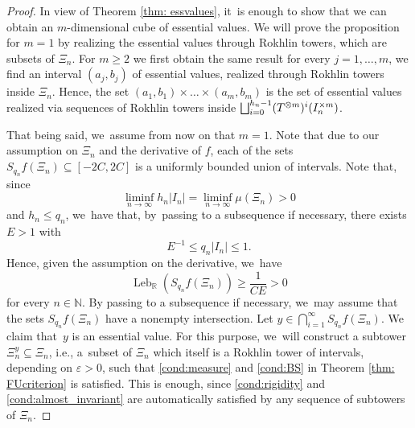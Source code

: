 \documentclass[JEP,XML,SOM,Unicode,NoEqCountersInSection,NoFloatCountersInSection,published]{cedram}
\let\oldbigsqcup\bigsqcup
\renewcommand{\bigsqcup}{\mathop{\textstyle\oldbigsqcup}\displaylimits}
\let\epsilon\varepsilon
\DeclareMathOperator{\Leb}{Leb}
\theoremstyle{plain}
\theoremstyle{definition}
\newcommand{\N}{\mathbb{N}}
\newcommand{\R}{\mathbb{R}}
\begin{document}
\begin{proof}
In view of Theorem \ref{thm: essvalues}, it~is enough to show that we can
obtain an $m$\nobreakdash-dimensional cube of essential values. We will prove the
proposition for $m=1$ by realizing the essential values through Rokhlin
towers, which are subsets of $\Xi_n$. For $m\ge 2$ we first obtain the
same result for every $j=1,\ldots,m$, \ie we find an interval $(a_j,b_j)$
of essential values, realized through Rokhlin towers inside $\Xi_n$. Hence,
the set $(a_1,b_1)\times\ldots\times(a_m,b_m)$ is the set of essential
values realized via sequences of Rokhlin towers inside
$\bigsqcup_{i=0}^{h_n-1}(T^{\otimes m})^i(I_n^{\times m})$.

That being said, we~assume from now on that $m=1$. Note that due to our assumption on $\Xi_n$ and the derivative of $f$, each of the sets $S_{q_n}f(\Xi_n)\subseteq [-2C,2C]$ is a uniformly bounded union of intervals. Note that, since
\[
\liminf_{n\to\infty} h_n |I_n| = \liminf_{n\to\infty}\mu(\Xi_n) > 0
\]
and $h_n\le q_n$, we~have that, by~passing to a subsequence if necessary, there exists $E>1$ with
\[
E^{-1}\le q_n|I_n|\le 1.
\]
Hence, given the assumption on the derivative, we~have
\[
\Leb_{\R}\left(S_{q_n}f(\Xi_n)\right)\ge \frac{1}{CE}>0
\]
for every $n\in\N$.
By passing to a subsequence if necessary, we~may assume that the sets $S_{q_n}f(\Xi_n)$ have a nonempty intersection. Let $y\in \bigcap_{i=1}^{\infty} S_{q_n}f(\Xi_n)$. We claim that~$y$ is an essential value. For this purpose, we~will construct a subtower $\Xi_{n}^{y}\subseteq \Xi_n$, i.e., a~subset of $\Xi_n$ which itself is a Rokhlin tower of intervals, depending on $\epsilon>0$, such that \eqref{cond:measure} and \eqref{cond:BS} in Theorem \ref{thm: FUcriterion} is satisfied. This is enough, since \eqref{cond:rigidity} and \eqref{cond:almost_invariant} are automatically satisfied by any sequence of subtowers of $\Xi_n$.


\end{proof}
\end{document}
